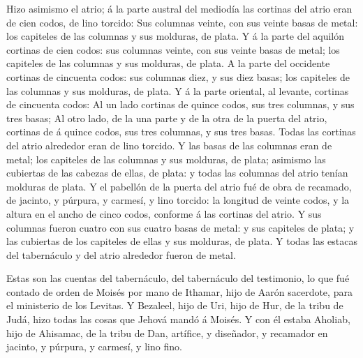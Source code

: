  Hizo asimismo el atrio; á la parte austral del mediodía las
cortinas del atrio eran de cien codos, de lino torcido: 
Sus columnas veinte, con sus veinte basas de metal: los capiteles de las
columnas y sus molduras, de plata.  Y á la parte del
aquilón cortinas de cien codos: sus columnas veinte, con sus veinte
basas de metal; los capiteles de las columnas y sus molduras, de plata.
 A la parte del occidente cortinas de cincuenta codos: sus
columnas diez, y sus diez basas; los capiteles de las columnas y sus
molduras, de plata.  Y á la parte oriental, al levante,
cortinas de cincuenta codos:  Al un lado cortinas de quince
codos, sus tres columnas, y sus tres basas;  Al otro lado,
de la una parte y de la otra de la puerta del atrio, cortinas de á
quince codos, sus tres columnas, y sus tres basas.  Todas
las cortinas del atrio alrededor eran de lino torcido.  Y
las basas de las columnas eran de metal; los capiteles de las columnas y
sus molduras, de plata; asimismo las cubiertas de las cabezas de ellas,
de plata: y todas las columnas del atrio tenían molduras de plata.
 Y el pabellón de la puerta del atrio fué de obra de
recamado, de jacinto, y púrpura, y carmesí, y lino torcido: la longitud
de veinte codos, y la altura en el ancho de cinco codos, conforme á las
cortinas del atrio.  Y sus columnas fueron cuatro con sus
cuatro basas de metal: y sus capiteles de plata; y las cubiertas de los
capiteles de ellas y sus molduras, de plata.  Y todas las
estacas del tabernáculo y del atrio alrededor fueron de metal.

 Estas son las cuentas del tabernáculo, del tabernáculo del
testimonio, lo que fué contado de orden de Moisés por mano de Ithamar,
hijo de Aarón sacerdote, para el ministerio de los Levitas.
 Y Bezaleel, hijo de Uri, hijo de Hur, de la tribu de Judá,
hizo todas las cosas que Jehová mandó á Moisés.  Y con él
estaba Aholiab, hijo de Ahisamac, de la tribu de Dan, artífice, y
diseñador, y recamador en jacinto, y púrpura, y carmesí, y lino fino.

